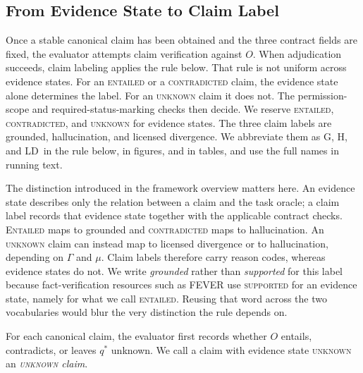 \documentclass{clv2025}
\newcommand{\LD}{\textsc{LD}}
\newcommand{\Hall}{\textsc{H}}
\newcommand{\Grd}{\textsc{G}}
\begin{document}
\subsection{From Evidence State to Claim Label}\label{subsec:rule}

Once a stable canonical claim has been obtained and the three contract fields
are fixed, the evaluator attempts claim verification against $O$.
When adjudication succeeds, claim labeling applies the rule below.
That rule is not uniform across evidence states.
For an \textsc{entailed} or a \textsc{contradicted} claim, the evidence state
alone determines the label.
For an \textsc{unknown} claim it does not.
The permission-scope and required-status-marking checks then decide.
We reserve \textsc{entailed}, \textsc{contradicted}, and \textsc{unknown} for
evidence states.
The three claim labels are grounded, hallucination, and licensed divergence.
We abbreviate them as \Grd, \Hall, and \LD\ in the rule below, in figures, and
in tables, and use the full names in running text.

The distinction introduced in the framework overview matters here. An evidence
state describes only the relation between a claim and the task oracle; a claim
label records that evidence state together with the applicable contract checks.
\textsc{Entailed} maps to grounded and \textsc{contradicted} maps to
hallucination. An \textsc{unknown} claim can instead map to licensed divergence
or to hallucination, depending on $\Gamma$ and $\mu$. Claim labels therefore
carry reason codes, whereas evidence states do not.
We write \emph{grounded} rather than \emph{supported} for this label because
fact-verification resources such as FEVER \citep{thorne_fever_2018} use
\textsc{supported} for an evidence state, namely for what we call
\textsc{entailed}.
Reusing that word across the two vocabularies would blur the very distinction
the rule depends on.

For each canonical claim, the evaluator first records whether $O$ entails,
contradicts, or leaves $q^*$ unknown.
We call a claim with evidence state \textsc{unknown} an
\emph{\textup{\textsc{unknown}} claim}.
\end{document}
